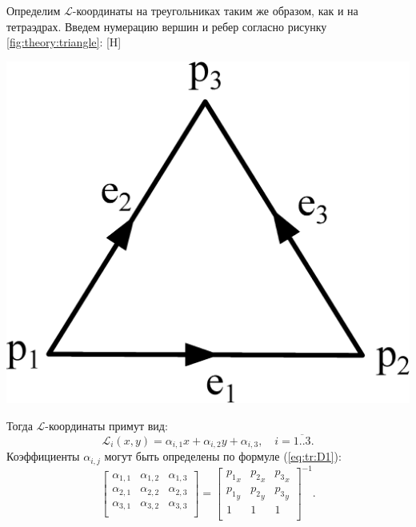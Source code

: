 \documentclass[a4paper,14pt]{article}
\makeatletter
\renewenvironment{figure}[1][\fps@figure]{
  \edef\@tempa{\noexpand\@float{figure}[#1]}
  \@tempa
  \addtocounter{foofigure}{1}
}{
  \end@float
}
\makeatother
\begin{document}
Определим $\mathcal{L}$-координаты на треугольниках таким же образом, как и на тетраэдрах. Введем нумерацию вершин и ребер согласно рисунку \ref{fig:theory:triangle}:
\begin{figure}[H]
	\centering
	\includegraphics[scale=0.25]{theory/triangle.eps}
	\caption{треугольный конечный элемент}
	\label{fig:theory:triangle}
\end{figure}

\noindent Тогда $\mathcal{L}$-координаты примут вид:
\begin{equation*}
	\mathcal{L}_i (x, y) = \alpha_{i, 1} x + \alpha_{i, 2} y + \alpha_{i, 3} , \text{~~~} i = \overline{1..3} . \label{eq:tr:L}
\end{equation*}
Коэффициенты $\alpha_{i, j}$ могут быть определены по формуле (\ref{eq:tr:D1}):
\begin{equation}
	\left[
	\begin{matrix}
		\alpha_{1, 1} & \alpha_{1, 2} & \alpha_{1, 3} \\
		\alpha_{2, 1} & \alpha_{2, 2} & \alpha_{2, 3} \\
		\alpha_{3, 1} & \alpha_{3, 2} & \alpha_{3, 3} \\
	\end{matrix}
	\right] = \left[
	\begin{matrix}
		{p_1}_x & {p_2}_x & {p_3}_x \\
		{p_1}_y & {p_2}_y & {p_3}_y \\
		1 & 1 & 1 \\
	\end{matrix}
	\right]^{-1} . \label{eq:tr:D1}
\end{equation}
\end{document}
